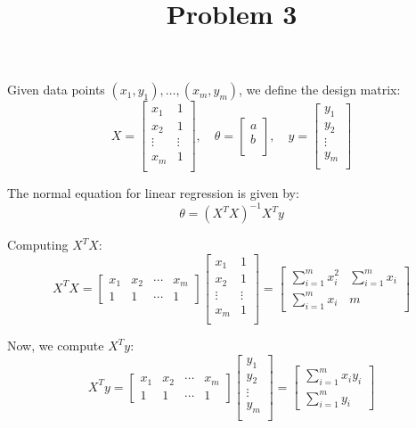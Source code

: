 \documentclass[12pt]{article}
\title{Problem 3}
\author{}
\date{}
\begin{document}
\maketitle
\thispagestyle{empty}

Given data points \( (x_1, y_1), \dots, (x_m, y_m) \), we define the design matrix:
\[
X = 
\begin{bmatrix}
x_1 & 1 \\
x_2 & 1 \\
\vdots & \vdots \\
x_m & 1 \\
\end{bmatrix},
\quad
\theta = 
\begin{bmatrix}
a \\
b \\
\end{bmatrix},
\quad
y = 
\begin{bmatrix}
y_1 \\
y_2 \\
\vdots \\
y_m \\
\end{bmatrix}
\]

The normal equation for linear regression is given by:
\[
\theta = (X^T X)^{-1} X^T y
\]

Computing \( X^T X \):
\[
X^T X =
\begin{bmatrix}
x_1 & x_2 & \cdots & x_m \\
1 & 1 & \cdots & 1
\end{bmatrix}
\begin{bmatrix}
x_1 & 1 \\
x_2 & 1 \\
\vdots & \vdots \\
x_m & 1 \\
\end{bmatrix}
=
\begin{bmatrix}
\sum_{i=1}^m x_i^2 & \sum_{i=1}^m x_i \\
\sum_{i=1}^m x_i & m
\end{bmatrix}
\]

Now, we compute \( X^T y \):
\[
X^T y =
\begin{bmatrix}
x_1 & x_2 & \cdots & x_m \\
1 & 1 & \cdots & 1
\end{bmatrix}
\begin{bmatrix}
y_1 \\
y_2 \\
\vdots \\
y_m \\
\end{bmatrix}
=
\begin{bmatrix}
\sum_{i=1}^m x_i y_i \\
\sum_{i=1}^m y_i
\end{bmatrix}
\]
\end{document}
